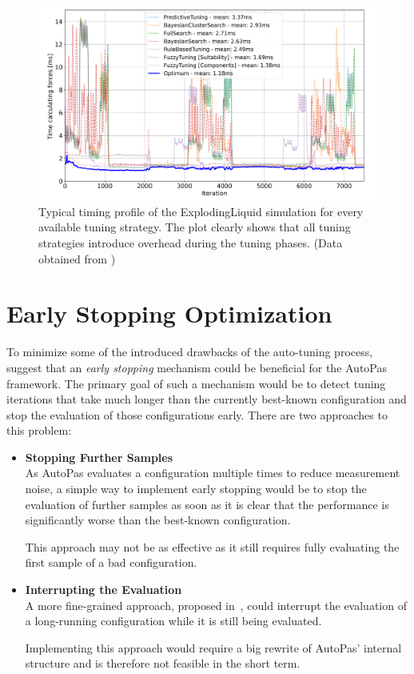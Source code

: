 \documentclass[conference]{IEEEtran}
\begin{document}
\begin{figure}[h]
    \centering
    \includegraphics[width=\columnwidth]{figures/unnecessary-tuning-phases.png}
    \caption{
        Typical timing profile of the ExplodingLiquid simulation for every available tuning strategy. The plot clearly shows that all tuning strategies introduce overhead during the tuning phases. (Data obtained from \cite{lerchner2024})
    }
    \label{fig:unnecessary-tuning-phases}
\end{figure}

\section{Early Stopping Optimization}

To minimize some of the introduced drawbacks of the auto-tuning process, \cite{endreport.pdf}\cite{Manuel_Lerchner_Thesis.pdf}\cite{autopas_issue673} suggest that an \textit{early stopping} mechanism could be beneficial for the AutoPas framework. The primary goal of such a mechanism would be to detect tuning iterations that take much longer than the currently best-known configuration and stop the evaluation of those configurations early. There are two approaches to this problem:


\begin{itemize}
    \item \textbf{Stopping Further Samples}\\
          As AutoPas evaluates a configuration multiple times to reduce measurement noise, a simple way to implement early stopping would be to stop the evaluation of further samples as soon as it is clear that the performance is significantly worse than the best-known configuration.

          This approach may not be as effective as it still requires fully evaluating the first sample of a bad configuration.
    \item \textbf{Interrupting the Evaluation}\\
          A more fine-grained approach, proposed in~\cite{endreport.pdf}, could interrupt the evaluation of a long-running configuration while it is still being evaluated.

          Implementing this approach would require a big rewrite of AutoPas' internal structure and is therefore not feasible in the short term.
\end{itemize}
\end{document}
